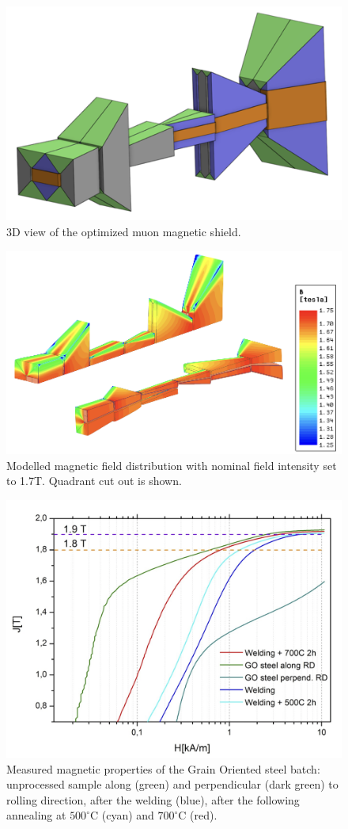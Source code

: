 \begin{figure}[thbp]
\centering
\includegraphics[width=0.8\columnwidth]{figs/BeamLine/shield_3dview.png}
\caption{3D view of the optimized muon magnetic shield.}
\label{fig:shieldSideView}
\end{figure}

\begin{figure}[thbp]
\centering
\includegraphics[width=0.8\columnwidth]{figs/BeamLine/shield_field_quadrant.png}
\caption{Modelled magnetic field distribution with nominal field intensity set to 1.7T. Quadrant cut out is shown.}
\label{fig:shieldMagneticField}
\end{figure}

\begin{figure}[thbp]
\centering
\includegraphics[width=0.8\columnwidth]{figs/BeamLine/go_steel_annealing.png}
\caption{Measured magnetic properties of the Grain Oriented steel batch: unprocessed sample along (green) and perpendicular (dark green) to rolling direction,
after the welding (blue), after the following annealing at $500^\circ$C (cyan) and $700^\circ$C (red).}
\label{fig:goSteelAnnealing}
\end{figure}


